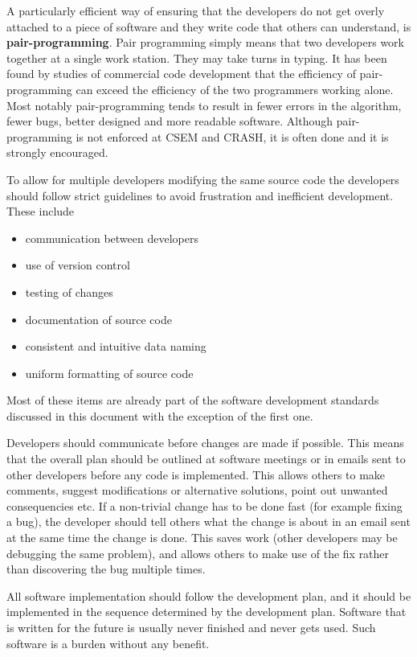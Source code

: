 \documentclass{article}
\begin{document}
A particularly efficient way of ensuring that the developers do not get 
overly attached to a piece of software and they write code that others
can understand, is {\bf pair-programming}. Pair programming simply means
that two developers work together at a single work station. They may take
turns in typing. It has been found by studies of commercial code 
development that the efficiency of pair-programming can exceed the 
efficiency of the two programmers working alone. Most notably pair-programming
tends to result in fewer errors in the algorithm, fewer bugs, 
better designed and more readable software. Although pair-programming is
not enforced at CSEM and CRASH, it is often done and it is strongly encouraged.

To allow for multiple developers modifying the same source code the developers
should follow strict guidelines to avoid frustration and inefficient 
development. These include
\begin{itemize}
\item communication between developers
\item use of version control
\item testing of changes
\item documentation of source code
\item consistent and intuitive data naming
\item uniform formatting of source code
\end{itemize}
Most of these items are already part of the software development standards
discussed in this document with the exception of the first one.

Developers should communicate before changes are made if possible. 
This means that the overall plan should be outlined at software meetings
or in emails sent to other developers before any code is implemented.
This allows others to make comments, suggest modifications or alternative
solutions, point out unwanted consequencies etc.
If a non-trivial change has to be done fast (for example fixing a bug), 
the developer should tell others what the change is about in an email sent 
at the same time the change is done. This saves work (other developers
may be debugging the same problem), and allows others to make use of the fix
rather than discovering the bug multiple times.

All software implementation should follow the development plan,
and it should be implemented in the sequence determined by the development
plan. Software that is written for the future is usually never finished and
never gets used. Such software is a burden without any benefit.
\end{document}
